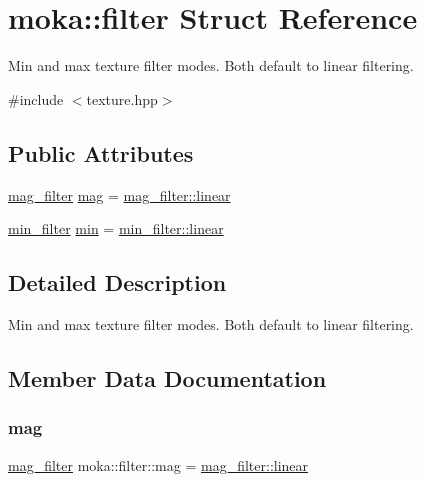 \hypertarget{structmoka_1_1filter}{}\section{moka\+::filter Struct Reference}
\label{structmoka_1_1filter}


Min and max texture filter modes. Both default to linear filtering.  




{\ttfamily \#include $<$texture.\+hpp$>$}

\subsection*{Public Attributes}
\begin{DoxyCompactItemize}
\item 
\mbox{\hyperlink{namespacemoka_a2391e4ae99494b70d0226ee0e586f33c}{mag\+\_\+filter}} \mbox{\hyperlink{structmoka_1_1filter_a50de045899a3c2d752de8dd48af920c4}{mag}} = \mbox{\hyperlink{namespacemoka_a2391e4ae99494b70d0226ee0e586f33ca9a932b3cb396238423eb2f33ec17d6aa}{mag\+\_\+filter\+::linear}}
\item 
\mbox{\hyperlink{namespacemoka_afeea6a53d61ee8561c91c62f5a051a77}{min\+\_\+filter}} \mbox{\hyperlink{structmoka_1_1filter_a1e278f0f9dfb7f1da5f3480ffebcf941}{min}} = \mbox{\hyperlink{namespacemoka_a2391e4ae99494b70d0226ee0e586f33ca9a932b3cb396238423eb2f33ec17d6aa}{min\+\_\+filter\+::linear}}
\end{DoxyCompactItemize}


\subsection{Detailed Description}
Min and max texture filter modes. Both default to linear filtering. 

\subsection{Member Data Documentation}
\mbox{\label{structmoka_1_1filter_a50de045899a3c2d752de8dd48af920c4}} 
\subsubsection{\texorpdfstring{mag}{mag}}
{\footnotesize\ttfamily \mbox{\hyperlink{namespacemoka_a2391e4ae99494b70d0226ee0e586f33c}{mag\+\_\+filter}} moka\+::filter\+::mag = \mbox{\hyperlink{namespacemoka_a2391e4ae99494b70d0226ee0e586f33ca9a932b3cb396238423eb2f33ec17d6aa}{mag\+\_\+filter\+::linear}}}


